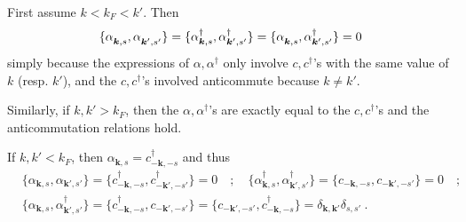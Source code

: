 \documentclass[11pt,a4paper]{article}
\newcommand{\boldk}{{\boldsymbol k}}
\newcommand{\nodagger}{{\vphantom{\dagger}}} %
\begin{document}
\begin{loesung}
  \begin{exenumerate}
  \item First assume $k<k_F<k'$. Then
    \begin{align}
      \{\alpha^\nodagger_{\boldk,s}, \alpha^\nodagger_{\boldk',s'}\}
      = \{\alpha_{\boldk,s}^\dagger, \alpha_{\boldk',s'}^\dagger\}
      = \{\alpha^\nodagger_{\boldk,s}, \alpha_{\boldk',s'}^\dagger\} = 0
    \end{align}
    simply because the expressions of $\alpha, \alpha^\dagger$ only involve $c,c^\dagger$'s with the same value
    of $k$ (resp. $k'$), and the $c,c^\dagger$'s involved anticommute because $k\neq k'$.

    Similarly, if $k,k'>k_F$, then the $\alpha,\alpha^\dagger$'s are exactly equal to the $c,c^\dagger$'s and
    the anticommutation relations hold.

    If $k,k'<k_F$, then $\alpha_{\boldk,s} = c_{-\boldk,-s}^\dagger$ and thus
    \begin{align*}
      &\{\alpha_{\boldk,s}, \alpha_{\boldk',s'}\} = \{ c_{-\boldk,-s}^\dagger, c_{-\boldk',-s'}^\dagger\} = 0
      \quad;\quad
      \{\alpha_{\boldk,s}^\dagger, \alpha_{\boldk',s'}^\dagger\} = \{ c_{-\boldk,-s}, c_{-\boldk',-s'}\} = 0
      \quad;\\
      &\{\alpha_{\boldk,s}, \alpha_{\boldk',s'}^\dagger\} = \{ c_{-\boldk,-s}^\dagger, c_{-\boldk',-s'} \}
       =  \{ c_{-\boldk',-s'}, c_{-\boldk,-s}^\dagger \} = \delta_{\boldk,\boldk'}\delta_{s,s'}\ .
    \end{align*}


\end{exenumerate}
\end{loesung}
\end{document}
